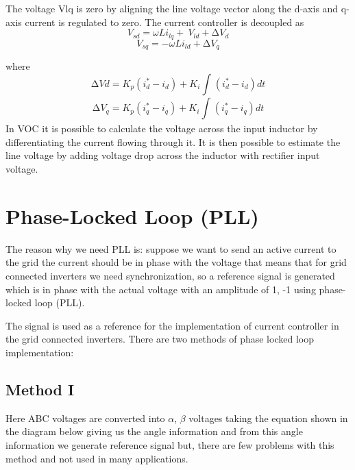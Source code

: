 \documentclass[12pt,a4paper]{book}
\begin{document}
The voltage Vlq is zero by aligning the line voltage vector along the d-axis and q-axis current is regulated to zero.
The current controller is decoupled as
\begin{equation}
  V_{sd} = \omega Li_{lq} + \ V_{ld} + {\mathrm{\Delta}V}_{d}
  \label{equation:eq6}
\end{equation}
\begin{equation}
  V_{sq} = - \omega Li_{ld} + \mathrm{\Delta}V_{q}
  \label{equation:eq7}
\end{equation}

where
\begin{equation}
  \mathrm{\Delta}Vd = K_{p}\left( i_{d}^{*} - i_{d} \right) + K_{i}\int_{}^{}{\left( i_{d}^{*} - i_{d} \right)dt}
  \label{equation:eq8}
\end{equation}
\begin{equation}
  {\mathrm{\Delta}V}_{q} = K_{p}\left( i_{q}^{*} - i_{q} \right) + K_{i}\int_{}^{}{\left( i_{q}^{*} - i_{q} \right)dt}
  \label{equation:eq9}
\end{equation}
In VOC it is possible to calculate the voltage across the input inductor by differentiating the current flowing through it. It is then possible to estimate the line voltage by adding voltage drop across the inductor with rectifier input voltage.

\section{Phase-Locked Loop (PLL)}
The reason why we need PLL is: suppose we want to send an active current to the grid the current should be in phase with the voltage that means that for grid connected inverters we need synchronization, so a reference signal is generated which is in phase with the actual voltage with an amplitude of 1, -1 using phase-locked loop (PLL).

The signal is used as a reference for the implementation of current controller in the grid connected inverters. There are two methods of phase locked loop implementation:
\subsection{Method I}
Here ABC voltages are converted into \(\alpha\), \(\beta\) voltages taking the equation shown in the diagram below giving us the angle information and from this angle information we generate reference signal but, there are few problems with this method and not used in many applications. 
\end{document}
